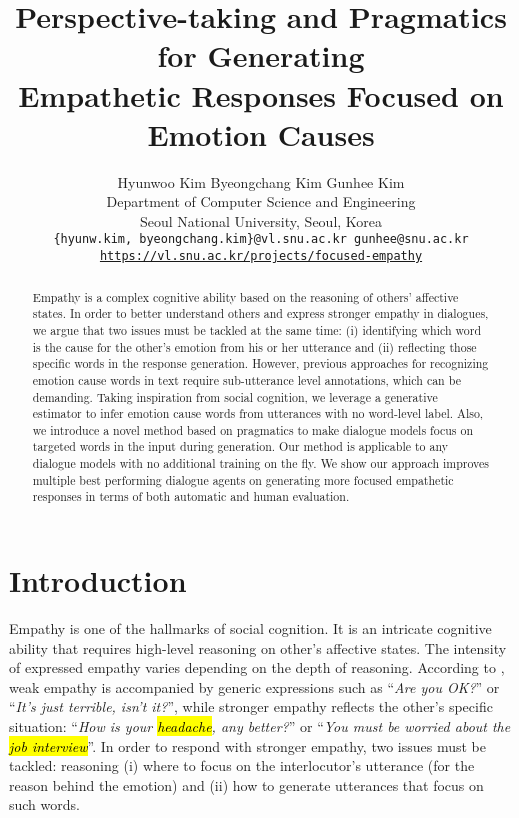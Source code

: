 \documentclass[11pt]{article}
\title{Perspective-taking and Pragmatics for Generating \\ Empathetic Responses Focused on Emotion Causes}
\author{
    Hyunwoo Kim \qquad Byeongchang Kim \qquad Gunhee Kim \\
    Department of Computer Science and Engineering\\
    Seoul National University, Seoul, Korea \\
    {\tt \small{ \{hyunw.kim, byeongchang.kim\}@vl.snu.ac.kr gunhee@snu.ac.kr }} \\
\href{https://vl.snu.ac.kr/projects/focused-empathy}{\textcolor{urlcolor}{\small{\texttt{https://vl.snu.ac.kr/projects/focused-empathy}}}}
}
\date{}
\newcommand{\hlc}[2][yellow]{{\colorlet{foo}{#1}\sethlcolor{foo}\hl{#2}}}
\newcommand{\fear}[1]{\hlc[fear]{#1}}
\newcommand{\sad}[1]{\hlc[sadness]{#1}}
\begin{document}
\maketitle
\begin{abstract}
    Empathy is a complex cognitive ability based on the reasoning of others' affective states.
    In order to better understand others and express stronger empathy in dialogues, we argue that two issues must be tackled at the same time:
    (i) identifying which word is the cause for the other's emotion from his or her utterance and (ii) reflecting those specific words in the response generation.
    However, previous approaches for recognizing emotion cause words in text require sub-utterance level annotations, which can be demanding.
    Taking inspiration from social cognition, we leverage a generative estimator to infer emotion cause words from utterances with no word-level label.
    Also, we introduce a novel method based on pragmatics to make dialogue models focus on targeted words in the input during generation.
    Our method is applicable to any dialogue models with no additional training on the fly.
    We show our approach improves multiple best performing dialogue agents on generating more focused empathetic responses in terms of both automatic and human evaluation.
\end{abstract}

\section{Introduction}
\label{sec:intro}

Empathy is one of the hallmarks of social cognition.
It is an intricate cognitive ability that requires high-level reasoning on other's affective states.
The intensity of expressed empathy varies depending on the depth of reasoning.
According to \citet{Sharma:2020:EMNLP}, weak empathy is accompanied by generic expressions such as ``\textit{Are you OK?}'' or ``\textit{It's just terrible, isn't it?}'',
while stronger empathy reflects the other's specific situation:
``\textit{How is your \sad{headache}, any better?}'' or ``\textit{You must be worried about the \fear{job interview}}''.
In order to respond with stronger empathy, two issues must be tackled: reasoning (i) where to focus on the interlocutor's utterance (for the reason behind the emotion) and
(ii) how to generate utterances that focus on such words.
\end{document}

